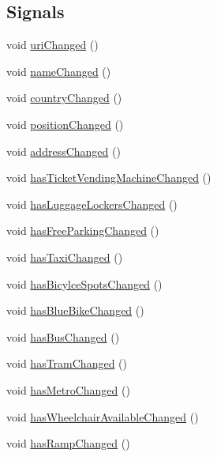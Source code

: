 \subsection*{Signals}
\begin{DoxyCompactItemize}
\item 
void \mbox{\hyperlink{classCSA_1_1Station_a7e1a832bc1ecff5811df303f907e9e04}{uri\+Changed}} ()
\item 
void \mbox{\hyperlink{classCSA_1_1Station_a86679a79fbe6a84b9890fcb15b5caa5e}{name\+Changed}} ()
\item 
void \mbox{\hyperlink{classCSA_1_1Station_ae7225d37accec94cf815e977b76109df}{country\+Changed}} ()
\item 
void \mbox{\hyperlink{classCSA_1_1Station_aceeec2e80a0a991acb3b74c539769bd8}{position\+Changed}} ()
\item 
void \mbox{\hyperlink{classCSA_1_1Station_a3d5070aa6b5fdb6adc893a51a0a1be2d}{address\+Changed}} ()
\item 
void \mbox{\hyperlink{classCSA_1_1Station_a269399db17611ed21b9a768cdc49159c}{has\+Ticket\+Vending\+Machine\+Changed}} ()
\item 
void \mbox{\hyperlink{classCSA_1_1Station_ad5cb28f158877e9c6f808bdc8a3b673c}{has\+Luggage\+Lockers\+Changed}} ()
\item 
void \mbox{\hyperlink{classCSA_1_1Station_af221724a180a08b013aae387a4234b41}{has\+Free\+Parking\+Changed}} ()
\item 
void \mbox{\hyperlink{classCSA_1_1Station_a06c0a1439cc5bfcbe8e065842f17f800}{has\+Taxi\+Changed}} ()
\item 
void \mbox{\hyperlink{classCSA_1_1Station_a2a974d267038288ae10200962f84eba5}{has\+Bicylce\+Spots\+Changed}} ()
\item 
void \mbox{\hyperlink{classCSA_1_1Station_a87ad9a5b8c69aca367ed1a5d65616ddb}{has\+Blue\+Bike\+Changed}} ()
\item 
void \mbox{\hyperlink{classCSA_1_1Station_a23a60c0e5b98f15e68d6fb71ee3bdd56}{has\+Bus\+Changed}} ()
\item 
void \mbox{\hyperlink{classCSA_1_1Station_ad997e9362b40f0f932e1a5d280dd42dc}{has\+Tram\+Changed}} ()
\item 
void \mbox{\hyperlink{classCSA_1_1Station_a1f006709983169db5059954aaeb868a4}{has\+Metro\+Changed}} ()
\item 
void \mbox{\hyperlink{classCSA_1_1Station_ad00b74e9cd7820e5f54a46efc006ff6a}{has\+Wheelchair\+Available\+Changed}} ()
\item 
void \mbox{\hyperlink{classCSA_1_1Station_a66bd1b6a58cd065fce51c8448019eab1}{has\+Ramp\+Changed}} ()

\end{DoxyCompactItemize}
